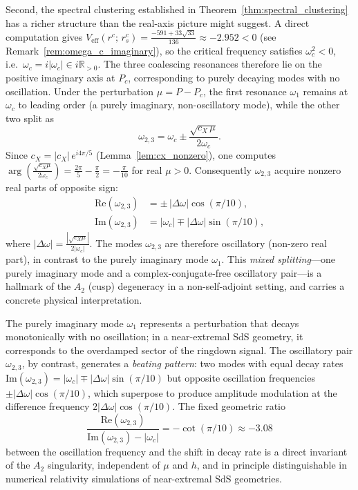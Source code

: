 \documentclass[12pt,a4paper]{amsart}
\theoremstyle{remark}
\begin{document}
Second, the spectral clustering established in Theorem~\ref{thm:spectral_clustering} has a
richer structure than the real-axis picture might suggest.
A direct computation gives
$V_{\mathrm{eff}}(r^c;\,r_s^c) = \tfrac{-591+33\sqrt{33}}{136} \approx -2.952 < 0$
(see Remark~\ref{rem:omega_c_imaginary}), so the critical frequency satisfies
$\omega_c^2 < 0$, i.e.\ $\omega_c = i|\omega_c| \in i\mathbb{R}_{>0}$.
The three coalescing resonances therefore lie on the positive imaginary axis at $P_c$,
corresponding to purely decaying modes with no oscillation.
Under the perturbation $\mu = P - P_c$, the first resonance $\omega_1$
remains at $\omega_c$ to leading order (a purely imaginary, non-oscillatory mode), while the
other two split as
\[
  \omega_{2,3} = \omega_c \pm \frac{\sqrt{c_X\,\mu}}{2\omega_c}.
\]
Since $c_X = |c_X|\,e^{i4\pi/5}$ (Lemma~\ref{lem:cx_nonzero}), one computes
$\arg\!\left(\tfrac{\sqrt{c_X\mu}}{2\omega_c}\right) = \tfrac{2\pi}{5} - \tfrac{\pi}{2} = -\tfrac{\pi}{10}$
for real $\mu > 0$.
Consequently $\omega_{2,3}$ acquire nonzero real parts of opposite sign:
\begin{align*}
  \mathrm{Re}(\omega_{2,3}) &= \pm\,|\Delta\omega|\cos(\pi/10), \\
  \mathrm{Im}(\omega_{2,3}) &= |\omega_c| \mp |\Delta\omega|\sin(\pi/10),
\end{align*}
where $|\Delta\omega| = \tfrac{|\sqrt{c_X\mu}|}{2|\omega_c|}$.
The modes $\omega_{2,3}$ are therefore oscillatory (non-zero real part), in contrast
to the purely imaginary mode $\omega_1$.
This \emph{mixed splitting}---one purely imaginary mode and a complex-conjugate-free
oscillatory pair---is a hallmark of the $A_2$ (cusp) degeneracy in a non-self-adjoint
setting, and carries a concrete physical interpretation.

The purely imaginary mode $\omega_1$ represents a perturbation that decays
monotonically with no oscillation; in a near-extremal SdS geometry, it corresponds to
the overdamped sector of the ringdown signal. The oscillatory pair $\omega_{2,3}$, by
contrast, generates a \emph{beating pattern}: two modes with equal decay rates
$\mathrm{Im}(\omega_{2,3}) = |\omega_c| \mp |\Delta\omega|\sin(\pi/10)$ but opposite
oscillation frequencies $\pm|\Delta\omega|\cos(\pi/10)$, which superpose to produce
amplitude modulation at the difference frequency $2|\Delta\omega|\cos(\pi/10)$.
The fixed geometric ratio
\[
  \frac{\mathrm{Re}(\omega_{2,3})}{\mathrm{Im}(\omega_{2,3}) - |\omega_c|}
  = -\cot(\pi/10) \approx -3.08
\]
between the oscillation frequency and the shift in decay rate is a direct invariant
of the $A_2$ singularity, independent of $\mu$ and $h$, and in principle distinguishable
in numerical relativity simulations of near-extremal SdS geometries.
\end{document}
